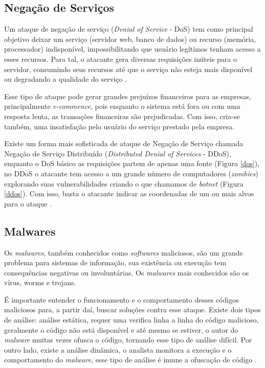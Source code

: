 \documentclass[
	12pt,				
	openright,		
	twoside,	
	a4paper,
	english,	
	brazil	
	]{abntex2}
\begin{document}
 \subsection{Negação de Serviços} \label{sec:negação}
 
Um ataque de negação de serviço (\textit{Denial of Service} - DoS) tem como principal objetivo deixar um serviço (servidor web, banco de dados) ou recurso (memória, processador)  indisponível, impossibilitando que usuário legítimos tenham acesso a esses recursos. Para tal, o atacante gera diversas requisições inúteis para o servidor, consumindo seus recursos até que o serviço não esteja mais disponível ou degradando a qualidade do serviço \cite{cryptsec}.

Esse tipo de ataque pode gerar grandes prejuízos financeiros para as empresas, principalmente \textit{e-commence}, pois enquanto o sistema está fora ou com uma resposta lenta, as transações financeiras são prejudicadas. Com isso, cria-se também, uma insatisfação pelo usuário do serviço prestado pela empresa.

Existe um forma mais sofisticada de ataque de Negação de Serviço chamada Negação de Serviço Distribuído (\textit{Distributed Denial of Services} - DDoS), enquanto o DoS básico as requisições partem de apenas uma fonte (Figura \ref{dos}), no DDoS o atacante tem acesso a um grande número de computadores (\textit{zombies}) explorando suas vulnerabilidades criando o que chamamos de \textit{botnet} (Figura \ref{ddos}). Com isso, basta o atacante indicar as coordenadas de um ou mais alvos para o ataque \cite{zargarjoshitipper}. 

 \subsection{Malwares} \label{sec:malwares}

 Os \textit{malwares}, também conhecidos como \textit{softwares} maliciosos, são um grande problema para sistemas de informação, sua existência ou execução tem consequências negativas ou involuntárias. Os \textit{malwares} mais conhecidos são os vírus, worms e trojans.

 É importante entender o funcionamento e o comportamento desses códigos maliciosos para, a partir daí, buscar soluções contra esse ataque. Existe dois tipos de análise: análise estática, requer uma verifica linha a linha do código malicioso, geralmente o código não está disponível e até mesmo se estiver, o autor do \textit{malware} muitas vezes ofusca o código, tornando esse tipo de análise difícil. Por outro lado, existe a análise dinâmica, o analista monitora a execução e o comportamento do \textit{malware}, esse tipo de análise é imune a ofuscação de código \cite{encycrypt}.
\end{document}
